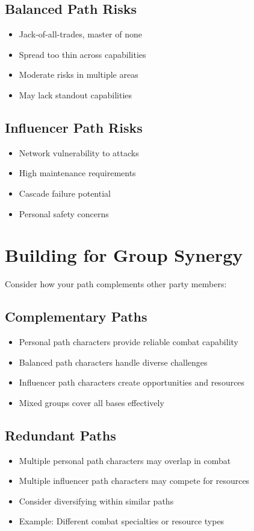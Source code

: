\begin{multicols}{2}
\subsection*{Balanced Path Risks}
\begin{itemize}
\item Jack-of-all-trades, master of none
\item Spread too thin across capabilities
\item Moderate risks in multiple areas
\item May lack standout capabilities
\end{itemize}

\subsection*{Influencer Path Risks}
\begin{itemize}
\item Network vulnerability to attacks
\item High maintenance requirements
\item Cascade failure potential
\item Personal safety concerns
\end{itemize}

\section{Building for Group Synergy}

Consider how your path complements other party members:

\subsection*{Complementary Paths}
\begin{itemize}
\item Personal path characters provide reliable combat capability
\item Balanced path characters handle diverse challenges
\item Influencer path characters create opportunities and resources
\item Mixed groups cover all bases effectively
\end{itemize}

\subsection*{Redundant Paths}
\begin{itemize}
\item Multiple personal path characters may overlap in combat
\item Multiple influencer path characters may compete for resources
\item Consider diversifying within similar paths
\item Example: Different combat specialties or resource types
\end{itemize}


\end{multicols}
